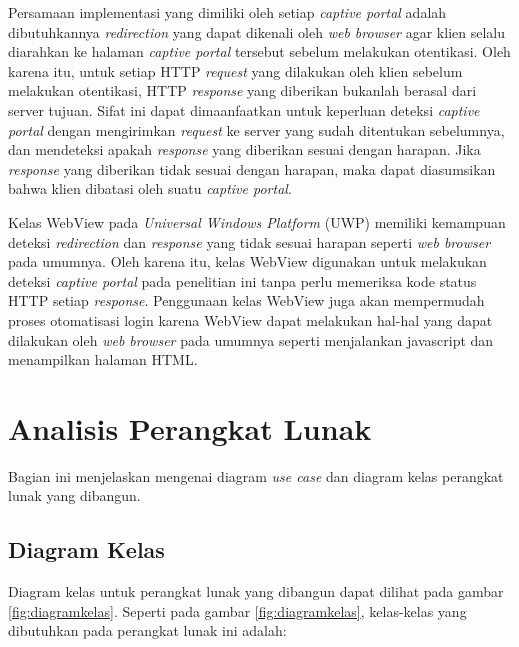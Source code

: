 Persamaan implementasi yang dimiliki oleh setiap \textit{captive portal} adalah dibutuhkannya \textit{redirection} yang dapat dikenali oleh \textit{web browser} agar klien selalu diarahkan ke halaman \textit{captive portal} tersebut sebelum melakukan otentikasi. Oleh karena itu, untuk setiap HTTP \textit{request} yang dilakukan oleh klien sebelum melakukan otentikasi, HTTP \textit{response} yang diberikan bukanlah berasal dari server tujuan. Sifat ini dapat dimaanfaatkan untuk keperluan deteksi \textit{captive portal} dengan mengirimkan \textit{request} ke server yang sudah ditentukan sebelumnya, dan mendeteksi apakah \textit{response} yang diberikan sesuai dengan harapan. Jika \textit{response} yang diberikan tidak sesuai dengan harapan, maka dapat diasumsikan bahwa klien dibatasi oleh suatu \textit{captive portal}.

Kelas WebView pada \textit{Universal Windows Platform} (UWP) memiliki kemampuan deteksi \textit{redirection} dan \textit{response} yang tidak sesuai harapan seperti \textit{web browser} pada umumnya. Oleh karena itu, kelas WebView digunakan untuk melakukan deteksi \textit{captive portal} pada penelitian ini tanpa perlu memeriksa kode status HTTP setiap \textit{response}. Penggunaan kelas WebView juga akan mempermudah proses otomatisasi login karena WebView dapat melakukan hal-hal yang dapat dilakukan oleh \textit{web browser} pada umumnya seperti menjalankan javascript dan menampilkan halaman HTML.



\section{Analisis Perangkat Lunak}
\label{sec:analisis_perangkat_lunak}

Bagian ini menjelaskan mengenai diagram \textit{use case} dan diagram kelas perangkat lunak yang dibangun.

\subsection{Diagram Kelas}
\label{sec:diagram_kelas}

Diagram kelas untuk perangkat lunak yang dibangun dapat dilihat pada gambar \ref{fig:diagramkelas}. Seperti pada gambar \ref{fig:diagramkelas}, kelas-kelas yang dibutuhkan pada perangkat lunak ini adalah:

